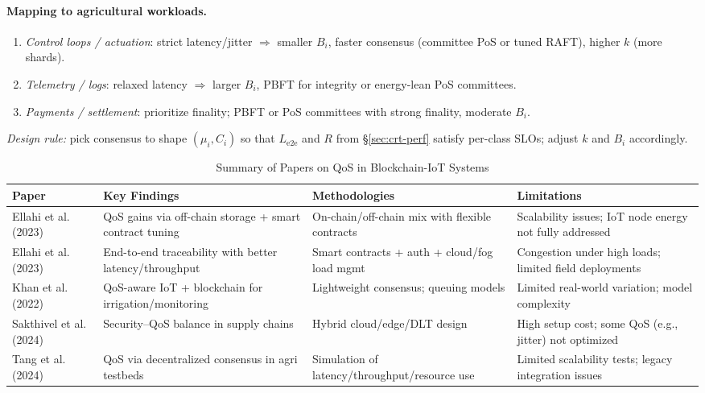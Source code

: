 \documentclass[12pt,onecolumn]{IEEEtran} %
\newcommand{\fitToPage}[1]{\begin{adjustbox}{max width=\textwidth}#1\end{adjustbox}}
\renewcommand{\arraystretch}{1.2} %
\begin{document}
\paragraph{Mapping to agricultural workloads.}
\begin{enumerate}
    \item \textit{Control loops / actuation}: strict latency/jitter $\Rightarrow$ smaller $B_i$, faster consensus (committee PoS or tuned RAFT), higher $k$ (more shards).
    \item \textit{Telemetry / logs}: relaxed latency $\Rightarrow$ larger $B_i$, PBFT for integrity or energy-lean PoS committees.
    \item \textit{Payments / settlement}: prioritize finality; PBFT or PoS committees with strong finality, moderate $B_i$.
\end{enumerate}

\noindent\textit{Design rule:} pick consensus to shape $(\mu_i,C_i)$ so that $L_{\mathrm{e2e}}$ and $R$ from §\ref{sec:crt-perf} satisfy per-class SLOs; adjust $k$ and $B_i$ accordingly.


\begin{table}[H]
\caption{Summary of Papers on QoS in Blockchain-IoT Systems}
\label{table4}
\centering
\fitToPage{
\begingroup
\setlength{\tabcolsep}{4pt}
\renewcommand{\arraystretch}{1.15}
\footnotesize
\begin{tabularx}{\textwidth}{@{}P{0.18\textwidth}YYY@{}}
\toprule
\textbf{Paper} & \textbf{Key Findings} & \textbf{Methodologies} & \textbf{Limitations} \\
\midrule
Ellahi et al. (2023) & QoS gains via off-chain storage + smart contract tuning & On-chain/off-chain mix with flexible contracts & Scalability issues; IoT node energy not fully addressed \\
\addlinespace
Ellahi et al. (2023) & End-to-end traceability with better latency/throughput & Smart contracts + auth + cloud/fog load mgmt & Congestion under high loads; limited field deployments \\
\addlinespace
Khan et al. (2022) & QoS-aware IoT + blockchain for irrigation/monitoring & Lightweight consensus; queuing models & Limited real-world variation; model complexity \\
\addlinespace
Sakthivel et al. (2024) & Security–QoS balance in supply chains & Hybrid cloud/edge/DLT design & High setup cost; some QoS (e.g., jitter) not optimized \\
\addlinespace
Tang et al. (2024) & QoS via decentralized consensus in agri testbeds & Simulation of latency/throughput/resource use & Limited scalability tests; legacy integration issues \\
\bottomrule
\end{tabularx}
\endgroup
}
\end{table}
\end{document}
